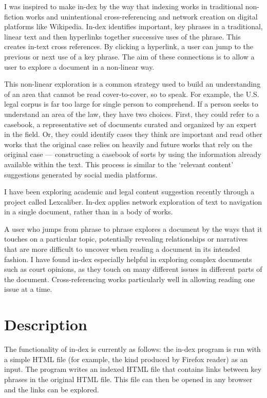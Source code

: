 \documentclass[12pt]{article}
\begin{document}
	I was inspired to make in-dex by the way that indexing works in traditional
	non-fiction works and unintentional cross-referencing and network creation
	on digital platforms like Wikipedia. In-dex identifies important, key
	phrases in a traditional, linear text and then hyperlinks together
	successive uses of the phrase. This creates in-text cross references. By
	clicking a hyperlink, a user can jump to the previous or next use of a key
	phrase. The aim of these connections is to allow a user to explore a
	document in a non-linear way.

	This non-linear exploration is a common strategy used to build an
	understanding of an area that cannot be read cover-to-cover, so to speak.
	For example, the U.S. legal corpus is far too large for single person to
	comprehend. If a person seeks to understand an area of the law, they have
	two choices. First, they could refer to a casebook, a representative set of
	documents curated and organized by an expert in the field.\autocite{lil}
	Or, they could identify cases they think are important and read other works
	that the original case relies on heavily and future works that rely on the
	original case --- constructing a casebook of sorts by using the information
	already available within the text. This process is similar to the ‘relevant
	content’ suggestions generated by social media platforms.\autocite{pixie}

	I have been exploring academic and legal content suggestion recently
	through a project called Lexcaliber.\autocite{lex} In-dex applies network
	exploration of text to navigation in a single document, rather than in a
	body of works.

	A user who jumps from phrase to phrase explores a document by the ways that
	it touches on a particular topic, potentially revealing relationships or
	narratives that are more difficult to uncover when reading a document in
	its intended fashion. I have found in-dex especially helpful in exploring
	complex documents such as court opinions, as they touch on many different
	issues in different parts of the document. Cross-referencing works
	particularly well in allowing reading one issue at a time.

	\section{Description}

	The functionality of in-dex is currently as follows: the in-dex program is
	run with a simple HTML file (for example, the kind produced by Firefox
	reader) as an input. The program writes an indexed HTML file that contains
	links between key phrases in the original HTML file. This file can then be
	opened in any browser and the links can be explored.
\end{document}
